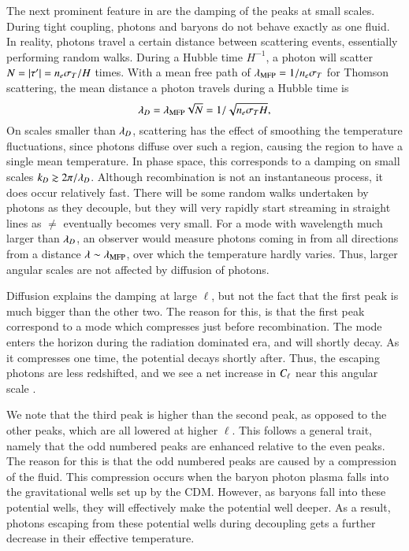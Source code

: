 The next prominent feature in  are the damping of the peaks at small scales. During tight coupling, photons and baryons do not behave exactly as one fluid. In reality, photons travel a certain distance between scattering events, essentially performing random walks. During a Hubble time $H^{-1}$, a photon will scatter $N=\abs{\tau'}=n_e \sigma_T / H$ times. With a mean free path of $\lambda_\mathrm{MFP}=1/n_e \sigma_T$ for Thomson scattering, the mean distance a photon travels during a Hubble time is 
\begin{equation}
    \lambda_D = \lambda_\mathrm{MFP} \sqrt{N} = 1 / \sqrt{n_e \sigma_T H},
\end{equation}
On scales smaller than $\lambda_D$, scattering has the effect of smoothing the temperature fluctuations, since photons diffuse over such a region, causing the region to have a single mean temperature. In phase space, this corresponds to a damping on small scales $k_D\gtrsim 2\pi/\lambda_D$. Although recombination is not an instantaneous process, it does occur relatively fast. There will be some random walks undertaken by photons as they decouple, but they will very rapidly start streaming in straight lines as $\ne$ eventually becomes very small. For a mode with wavelength much larger than $\lambda_D$, an observer would measure photons coming in from all directions from a distance $\lambda\sim\lambda_\mathrm{MFP}$, over which the temperature hardly varies. Thus, larger angular scales are not affected by diffusion of photons.  

Diffusion explains the damping at large $\ell$, but not the fact that the first peak is much bigger than the other two. The reason for this, is that the first peak correspond to a mode which compresses just before recombination. The mode enters the horizon during the radiation dominated era, and will shortly decay. As it compresses one time, the potential decays shortly after. Thus, the escaping photons are less redshifted, and we see a net increase in $C_\ell$ near this angular scale .

We note that the third peak is higher than the second peak, as opposed to the other peaks, which are all lowered at higher $\ell$. This follows a general trait, namely that the odd numbered peaks are enhanced relative to the even peaks. The reason for this is that the odd numbered peaks are caused by a compression of the fluid. This compression occurs when the baryon photon plasma falls into the gravitational wells set up by the CDM. However, as baryons fall into these potential wells, they will effectively make the potential well deeper. As a result, photons escaping from these potential wells during decoupling gets a further decrease in their effective temperature.     

